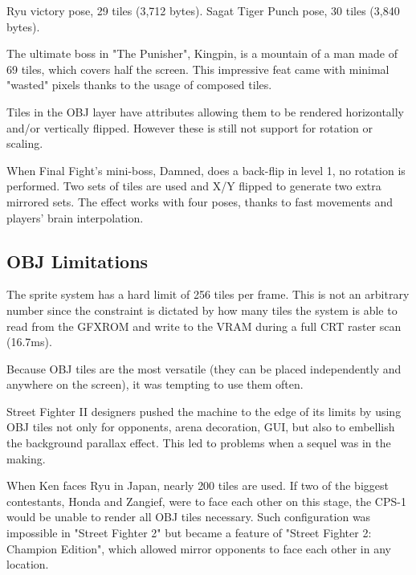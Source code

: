 Ryu victory pose, 29 tiles (3,712 bytes). Sagat Tiger Punch pose, 30 tiles (3,840 bytes). 




The ultimate boss in "The Punisher", Kingpin, is a mountain of a man made of 69 tiles, which covers half the screen. This impressive feat came with minimal "wasted" pixels thanks to the usage of composed tiles.


Tiles in the OBJ layer have attributes allowing them to be rendered horizontally and/or vertically flipped. However these is still not support for rotation or scaling.

\begin{minipage}[t]{0.535\linewidth}
\end{minipage}%
\hfill%
\begin{minipage}[t]{0.445\linewidth}
\end{minipage}

 When Final Fight's  mini-boss, Damned, does a back-flip in level 1, no rotation is performed. Two sets of tiles are used and X/Y flipped to generate two extra mirrored sets. The effect works with four poses, thanks to fast movements and players' brain interpolation.

\pagebreak

\subsection{OBJ Limitations}
The sprite system has a hard limit of 256 tiles per frame. This is not an arbitrary number since the constraint is dictated by how many tiles the system is able to read from the GFXROM and write to the VRAM during a full CRT raster scan (16.7ms).

Because OBJ tiles are the most versatile (they can be placed independently and anywhere on the screen), it was tempting to use them often.

Street Fighter II designers pushed the machine to the edge of its limits by using OBJ tiles not only for opponents, arena decoration, GUI, but also to embellish the background parallax effect. This led to problems when a sequel was in the making.

When Ken faces Ryu in Japan, nearly 200 tiles are used. If two of the biggest contestants, Honda and Zangief, were to face each other on this stage, the CPS-1 would be unable to render all OBJ tiles necessary. Such configuration was impossible in "Street Fighter 2" but became a feature of "Street Fighter 2: Champion Edition",  which allowed mirror opponents to face each other in any location.
\vfill
{}



